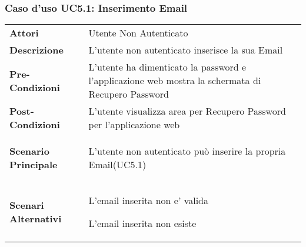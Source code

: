 \subsubsection{Caso d'uso UC5.1:  Inserimento Email}
\label{UC5_1}

\begin{minipage}{\linewidth}
\begin{longtable}{ l | p{11cm}}
	\hline
	\rowcolor{Gray}
	 \multicolumn{2}{c}{UC5.1 - Inserimento Email} \\
	 \hline
	\textbf{Attori} & Utente Non Autenticato \\
	\textbf{Descrizione} & L'utente non autenticato inserisce la sua Email  \\
	\textbf{Pre-Condizioni} & L'utente ha dimenticato la password e l'applicazione web mostra la schermata di Recupero Password\\
	\textbf{Post-Condizioni} & L'utente visualizza area per Recupero Password per l'applicazione web \\
	\textbf{Scenario Principale} & \begin{enumerate*}[label=(\arabic*.),itemjoin={\newline}]
		\item L'utente non autenticato può inserire la propria Email(UC5.1)
	\end{enumerate*}\\
	\textbf{Scenari Alternativi} & 
	\begin{enumerate*}[label=(\arabic*.),itemjoin={\newline}]
		\item L'email inserita non e' valida
		\item L'email inserita non esiste
	\end{enumerate*}\\
\end{longtable}
\end{minipage}